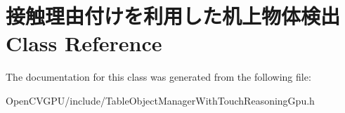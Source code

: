 \hypertarget{class_xE6_x8E_xA5_xE8_xA7_xA6_xE7_x90_x86_xE7_x94_xB1_xE4_xBB_x98_xE3_x81_x91_xE3_x82_x92_xE5_x890112ad43302b940b72aaba1c07dd87f}{}\section{接触理由付けを利用した机上物体検出 Class Reference}
\label{class_xE6_x8E_xA5_xE8_xA7_xA6_xE7_x90_x86_xE7_x94_xB1_xE4_xBB_x98_xE3_x81_x91_xE3_x82_x92_xE5_x890112ad43302b940b72aaba1c07dd87f}


The documentation for this class was generated from the following file\+:\begin{DoxyCompactItemize}
\item 
Open\+C\+V\+G\+P\+U/include/Table\+Object\+Manager\+With\+Touch\+Reasoning\+Gpu.\+h\end{DoxyCompactItemize}
